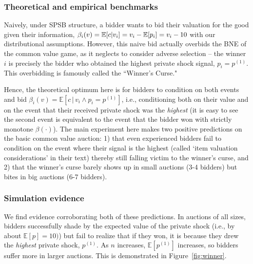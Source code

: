 \documentclass{article} %
\begin{document}
\subsubsection{Theoretical and empirical benchmarks}
Naively, under SPSB structure, a bidder wants to bid their valuation for the good given their information, $\beta_i(v) = \mathbb{E}[c | v_i] = v_i - \mathbb{E}[p_i] = v_i - 10$ with our distributional assumptions. 
However, this naive bid actually overbids the BNE of the common value game, as it neglects to consider adverse selection -- the winner $i$ is precisely the bidder who obtained the highest private shock signal, $p_i = p^(1)$. 
This overbidding is famously called the ``Winner's Curse." 

Hence, the theoretical optimum here is for bidders to condition on both events and bid $\beta_i(v) = \mathbb{E}[c \, | \, v_i \wedge p_i = p^{(1)}]$, i.e., conditioning both on their value and on the event that their received private shock was the \textit{highest} (it is easy to see the second event is equivalent to the event that the bidder won with strictly monotone $\beta(\cdot)$). 
The main experiment here \cite{kagel1986winner} makes two positive predictions on the basic common value auction: 1) that even experienced bidders fail to condition on the event where their signal is the highest (called `item valuation considerations' in their text) thereby still falling victim to the winner's curse, and 2) that the winner's curse barely shows up in small auctions (3-4 bidders) but bites in big auctions (6-7 bidders). 

\subsubsection{Simulation evidence}
We find evidence corroborating both of these predictions. 
In auctions of all sizes, bidders successfully shade by the expected value of the private shock (i.e., by about $\mathbb{E}[p] = 10)$) but fail to realize that if they won, it is because they drew the \textit{highest} private shock, $p^{(1)}$. 
As $n$ increases, $\mathbb{E}[p^{(1)}]$ increases, so bidders suffer more in larger auctions. 
This is demonstrated in Figure~\ref{fig:winner}. 
\end{document}
